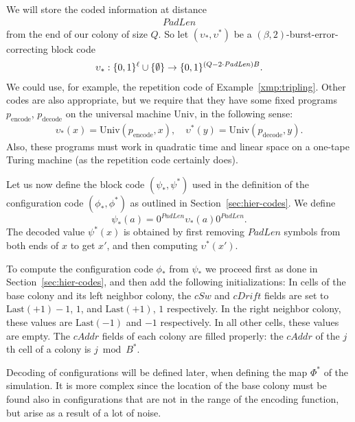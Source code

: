 \documentclass[12pt]{memoir}
\newcommand{\fld}[1]{\ensuremath{\textit{#1}}}
\def\B{B}
\newcommand{\cAddr}{\fld{cAddr}}
\newcommand{\cDrift}{\fld{cDrift}}
\newcommand{\cSweep}{\fld{cSw}}
\newcommand{\decode}{\mathrm{decode}}
\newcommand{\encode}{\mathrm{encode}}
\newcommand{\Last}{\mathrm{Last}}
\newcommand{\PadLen}{\mathit{PadLen}}
\newcommand{\Un}{\mathrm{Univ}}
\begin{document}
We will store the coded information at distance 
\begin{align}\label{eq:penLen}
    \PadLen
\end{align}
from the end of our colony of size \( Q \).
So let \( (\upsilon_{*}, \upsilon^{*}) \) be a \( (\beta,2) \)-burst-error-correcting block code
\begin{align*}
  \upsilon_{*}: \{0,1\}^{\ell} \cup \set{\emptyset}
   \to\{0,1\}^{(Q-2\cdot\PadLen)\B}.
\end{align*}
We could use, for example, the repetition code of Example~\ref{xmp:tripling}.
Other codes are also appropriate, but we require that they have some fixed
programs \( p_{\encode} \), \( p_{\decode} \)
on the universal machine \( \Un \), in the following sense:
 \begin{align*}
   \upsilon_{*}(x)=\Un(p_{\encode},x),\quad
   \upsilon^{*}(y)=\Un(p_{\decode}, y).
 \end{align*}
Also, these programs must work in quadratic time and
linear space on a one-tape Turing machine (as the repetition code certainly does).

Let us now define the block code \( (\psi_*, \psi^*) \) used in the
definition of the configuration code \( (\phi_*, \phi^*) \) as 
outlined in Section~\ref{sec:hier-codes}.
We define
\begin{equation}\label{eq:psi}
   \psi_*(a)  = 0^{\PadLen}\upsilon_{*}(a)0^{\PadLen}.
\end{equation}
The decoded value \( \psi^{*}(x) \) is obtained by first removing \( \PadLen \) symbols
from both ends of \( x \) to get \( x' \), and then computing \( \upsilon^{*}(x') \).

To compute the configuration code \( \phi_{*} \) from \( \psi_{*} \) we proceed first as
done in Section~\ref{sec:hier-codes}, and then add the following initializations:
In cells of the base colony and its left neighbor  colony,
the \( \cSweep \) and \( \cDrift \) fields are set 
to \( \Last(+1)-1 \),  \( 1 \), and \( \Last(+1) \),  \( 1 \) respectively.
In the right neighbor colony, these values are \( \Last(-1) \) and \( -1 \) respectively.
In all other cells, these values are empty.
The \( \cAddr \) fields of each colony are filled properly:
the \( \cAddr \) of the \( j \)th cell of a colony
is \( j \bmod \B^* \).

Decoding of configurations will be defined later, 
when defining the map \( \Phi^{*} \) of the simulation.
It is more complex since 
the location of the base colony must be found also in
configurations that are not in the range of the encoding
function, but arise as a result of a lot of noise.
\end{document}
